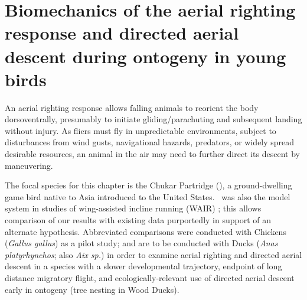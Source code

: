 
\section{Biomechanics of the aerial righting response and directed aerial descent during ontogeny in young birds}
\label{sec:Chukar}
An aerial righting response allows falling animals to reorient the body dorsoventrally, presumably to initiate gliding/parachuting and subsequent landing without injury.  As fliers must fly in unpredictable environments, subject to disturbances from wind gusts, navigational hazards, predators, or widely spread desirable resources, an animal in the air may need to further direct its descent by maneuvering.

The focal species for this chapter is the Chukar Partridge (\Alectorischukar), a ground-dwelling game bird native to Asia introduced to the United States.  \Achukar\ was also the model system in studies of wing-assisted incline running (WAIR) \citep{Dial:2003, Dial:2008}; this allows comparison of our results with existing data purportedly in support of an alternate hypothesis.  Abbreviated comparisons were conducted with Chickens (\emph{Gallus gallus}) as a pilot study; and are to be conducted with Ducks (\emph{Anas platyrhynchos}; also \emph{Aix sp.}) in order to examine aerial righting and directed aerial descent in a species with a slower developmental trajectory, endpoint of long distance migratory flight, and ecologically-relevant use of directed aerial descent early in ontogeny (tree nesting in Wood Ducks).



